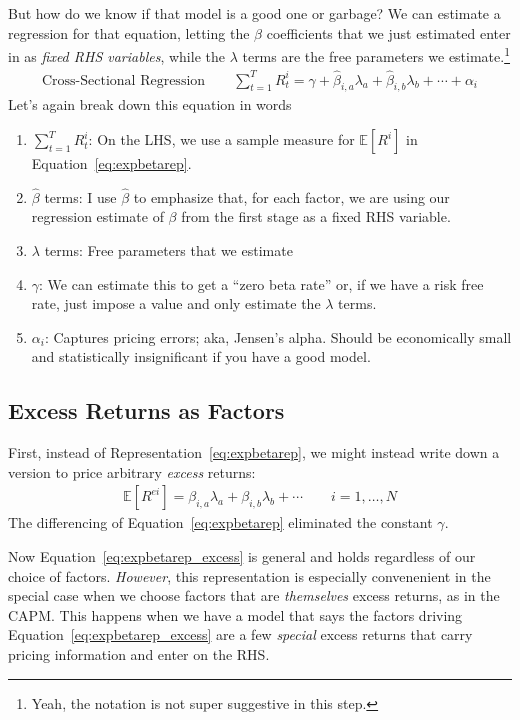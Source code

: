 \documentclass[12pt]{article}
\theoremstyle{plain}
\theoremstyle{definition}
\theoremstyle{remark}
\begin{document}
But how do we know if that model is a good one or garbage? We can
estimate a regression for that equation, letting the $\beta$
coefficients that we just estimated enter in as \emph{fixed RHS
variables}, while the $\lambda$ terms are the free parameters we
estimate.\footnote{Yeah, the notation is not super suggestive in this
step.}
\begin{align}
  \text{Cross-Sectional Regression}\qquad
  \sum^T_{t=1} R^i_t = \gamma + \hat{\beta}_{i,a} \lambda_a
  + \hat{\beta}_{i,b} \lambda_b + \cdots
  + \alpha_i
\end{align}
Let's again break down this equation in words
\begin{enumerate}
  \item $\sum^T_{t=1} R^i_t$: On the LHS, we use a sample measure
    for $\mathbb{E}[R^i]$ in Equation~\ref{eq:expbetarep}.
  \item $\hat{\beta}$ terms: I use $\hat{\beta}$ to emphasize that, for
    each factor, we are using our regression estimate of $\beta$ from
    the first stage as a fixed RHS variable.
  \item $\lambda$ terms: Free parameters that we estimate
  \item $\gamma$: We can estimate this to get a ``zero beta rate''
    or, if we have a risk free rate, just impose a value and only
    estimate the $\lambda$ terms.
  \item $\alpha_i$: Captures pricing errors; aka, Jensen's alpha. Should
    be economically small and statistically insignificant if you have a
    good model.
\end{enumerate}

\subsection{Excess Returns as Factors}

First, instead of Representation~\ref{eq:expbetarep}, we might instead
write down a version to price arbitrary \emph{excess} returns:
\begin{align}
  \mathbb{E}[R^{ei}]
  = \beta_{i,a}\lambda_a + \beta_{i,b} \lambda_b + \cdots
  \qquad i = 1,\ldots,N
  \label{eq:expbetarep_excess}
\end{align}
The differencing of Equation~\ref{eq:expbetarep} eliminated the constant
$\gamma$.

Now Equation~\ref{eq:expbetarep_excess} is general and holds regardless
of our choice of factors. \emph{However}, this representation is
especially convenenient in the special case when we choose factors that are
\emph{themselves} excess returns, as in the CAPM.  This happens when we
have a model that says the factors driving
Equation~\ref{eq:expbetarep_excess} are a few \emph{special} excess
returns that carry pricing information and enter on the RHS.
\end{document}
